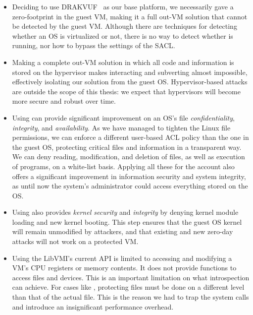 \begin{itemize}
\item Deciding to use DRAKVUF~\cite{lengyel2014drakvuf} as our base platform, we necessarily gave  a zero-footprint in the guest \ac{VM}, making it a full out-\ac{VM} solution that cannot be detected by the guest \ac{VM}. Although there are techniques for detecting whether an \ac{OS} is virtualized or not, there is no way to detect whether  is running, nor how to bypass the settings of the \ac{SACL}.

\item Making  a complete out-\ac{VM} solution in which all code and information is stored on the hypervisor makes interacting and subverting  almost impossible, effectively isolating our solution from the guest \ac{OS}. Hypervisor-based attacks are outside the scope of this thesis: we expect that hypervisors will become more secure and robust over time.

\item Using  can provide significant improvement on an \ac{OS}'s file \emph{confidentiality}, \emph{integrity}, and \emph{availability}. As we have managed to tighten the Linux file permissions, we can enforce a different user-based \ac{ACL} policy than the one in the guest \ac{OS}, protecting critical files and information in a transparent way. We can deny reading, modification, and deletion of files, as well as execution of programs, on a white-list basis. Applying all these for the  account also offers a significant improvement in information security and system integrity, as until now the system's administrator could access everything stored on the \ac{OS}.

\item Using  also provides \emph{kernel security} and \emph{integrity} by denying kernel module loading and new kernel booting. This step ensures that the guest \ac{OS} kernel will remain unmodified by attackers, and that existing and new zero-day attacks will not work on a  protected \ac{VM}.

\item Using the LibVMI's current \ac{API} is limited to accessing and modifying a \ac{VM}'s \ac{CPU} registers or memory contents. It does not provide functions to access files and devices. This is an important limitation on what introspection can achieve. For cases like , protecting files must be done on a different level than that of the actual file. This is the reason we had to trap the system calls and introduce an insignificant performance overhead.


\end{itemize}
